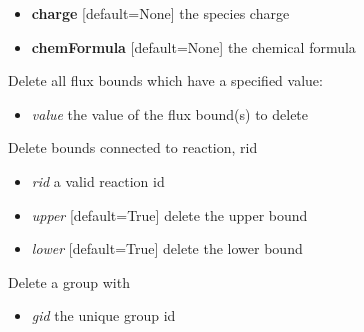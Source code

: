 \documentclass[a4paper,11pt,english]{sphinxmanual}
\begin{document}
\begin{fulllineitems}
\begin{fulllineitems}
\begin{itemize}
\item {} 
\textbf{charge} {[}default=None{]} the species charge

\item {} 
\textbf{chemFormula} {[}default=None{]} the chemical formula

\end{itemize}

\end{fulllineitems}


\begin{fulllineitems}
\label{modules_doc:cbmpy.CBModel.Model.deleteAllFluxBoundsWithValue}
Delete all flux bounds which have a specified value:
\begin{itemize}
\item {} 
\emph{value} the value of the flux bound(s) to delete

\end{itemize}

\end{fulllineitems}


\begin{fulllineitems}
\label{modules_doc:cbmpy.CBModel.Model.deleteBoundsForReactionId}
Delete bounds connected to reaction, rid
\begin{itemize}
\item {} 
\emph{rid} a valid reaction id

\item {} 
\emph{upper} {[}default=True{]} delete the upper bound

\item {} 
\emph{lower} {[}default=True{]} delete the lower bound

\end{itemize}

\end{fulllineitems}


\begin{fulllineitems}
\label{modules_doc:cbmpy.CBModel.Model.deleteGroup}
Delete a group with
\begin{itemize}
\item {} 
\emph{gid} the unique group id


\end{itemize}
\end{fulllineitems}
\end{fulllineitems}
\end{document}
